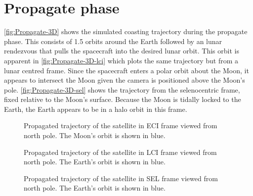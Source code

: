 

\clearpage 


\section{Propagate phase} \label{sec:Propagate}

\autoref{fig:Propagate-3D} shows the simulated coasting trajectory during the propagate phase. This consists of 1.5 orbits around the Earth followed by an lunar rendezvous that pulls the spacecraft into the desired lunar orbit. This orbit is apparent in \autoref{fig:Propagate-3D-lci} which plots the same trajectory but from a lunar centred frame. Since the spacecraft enters a polar orbit about the Moon, it appears to intersect the Moon given the camera is positioned above the Moon's pole. \autoref{fig:Propagate-3D-sel} shows the trajectory from the selenocentric frame, fixed relative to the Moon's surface. Because the Moon is tidally locked to the Earth, the Earth appears to be in a halo orbit in this frame.

\begin{figure}[h]
\centering
\def\svgwidth{\figurewidth}

\caption{Propagated trajectory of the satellite in ECI frame viewed from north pole. The Moon's orbit is shown in blue.} \label{fig:Propagate-3D}
\end{figure}

\begin{figure}
\centering
\def\svgwidth{\figurewidth}

\caption{Propagated trajectory of the satellite in LCI frame viewed from north pole. The Earth's orbit is shown in blue.} \label{fig:Propagate-3D-lci}
\end{figure}

\begin{figure}
\centering
\def\svgwidth{\figurewidth}

\caption{Propagated trajectory of the satellite in SEL frame viewed from north pole. The Earth's orbit is shown in blue.} \label{fig:Propagate-3D-sel}
\end{figure}

